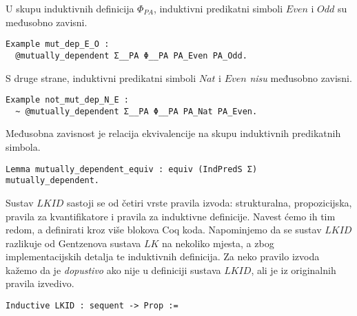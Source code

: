 \begin{example}
  U skupu induktivnih definicija \(\Phi_{\mathit{PA}}\),
  induktivni predikatni simboli \(\mathit{Even}\) i \(\mathit{Odd}\)
  su međusobno zavisni.
\begin{verbatim}
Example mut_dep_E_O :
  @mutually_dependent Σ__PA Φ__PA PA_Even PA_Odd.
\end{verbatim}
  \noindent S druge strane, induktivni predikatni simboli \(\mathit{Nat}\) i \(\mathit{Even}\)
  \textit{nisu} međusobno zavisni.
\begin{verbatim}
Example not_mut_dep_N_E :
  ~ @mutually_dependent Σ__PA Φ__PA PA_Nat PA_Even.
\end{verbatim}
\end{example}

\begin{lemma}
  Međusobna zavisnost je relacija ekvivalencije na skupu induktivnih predikatnih simbola.
\begin{verbatim}
Lemma mutually_dependent_equiv : equiv (IndPredS Σ) mutually_dependent.
\end{verbatim}
\end{lemma}

Sustav \(\mathit{LKID}\) sastoji se od četiri vrste pravila izvoda:
strukturalna, propozicijska, pravila za kvantifikatore i pravila za induktivne definicije.
Navest ćemo ih tim redom, a definirati kroz više blokova Coq koda.
Napominjemo da se sustav \(\mathit{LKID}\) razlikuje od Gentzenova sustava \(\mathit{LK}\)
na nekoliko mjesta, a zbog implementacijskih detalja te induktivnih definicija.
Za neko pravilo izvoda kažemo da je \textit{dopustivo} ako nije u definiciji sustava \(\mathit{LKID}\),
ali je iz originalnih pravila izvedivo.
\begin{verbatim}
Inductive LKID : sequent -> Prop := 
\end{verbatim}
